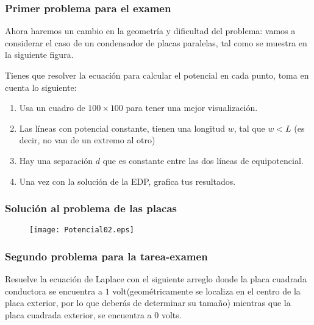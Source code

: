 \begin{frame}
\frametitle{Primer problema para el examen}
Ahora haremos un cambio en la geometría y dificultad del problema: vamos a considerar el caso de un condensador de placas paralelas, tal como se muestra en  la siguiente figura.
\begin{center}
\end{center}
\end{frame}
\begin{frame}
Tienes que resolver la ecuación para calcular el potencial en cada punto, toma en cuenta lo siguiente:
\begin{enumerate}
\item Usa un cuadro de $100 \times 100$ para tener una mejor visualización.
\item Las líneas con potencial constante, tienen una longitud $w$, tal que $w<L$  (es decir, no van de un extremo al otro)
\item Hay una separación $d$ que es constante entre las dos líneas de equipotencial.
\item Una vez con la solución de la EDP, grafica tus resultados.
\end{enumerate}
\end{frame}
\begin{frame}[fragile]
\frametitle{Solución al problema de las placas}
\begin{figure}
	\centering
	\texttt{[image: Potencial02.eps]} 
\end{figure}
\end{frame}
\begin{frame}
\frametitle{Segundo problema para la tarea-examen}
Resuelve la ecuación de Laplace con el siguiente arreglo donde la placa cuadrada conductora se encuentra a $1$ volt(geométricamente se localiza en el centro de la placa exterior, por lo que deberás de determinar su tamaño) mientras que la placa cuadrada exterior, se encuentra a $0$ volts.
\begin{center}
\end{center}
\end{frame}
